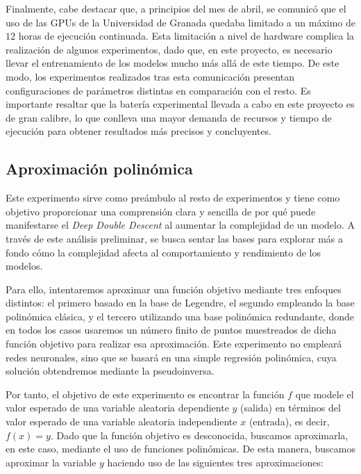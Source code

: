 Finalmente, cabe destacar que, a principios del mes de abril, se comunicó que el uso de las GPUs de la Universidad de Granada quedaba limitado a un máximo de $12$ horas de ejecución continuada. Esta limitación a nivel de hardware complica la realización de algunos experimentos, dado que, en este proyecto, es necesario llevar el entrenamiento de los modelos mucho más allá de este tiempo. De este modo, los experimentos realizados tras esta comunicación presentan configuraciones de parámetros distintas en comparación con el resto. Es importante resaltar que la batería experimental llevada a cabo en este proyecto es de gran calibre, lo que conlleva una mayor demanda de recursos y tiempo de ejecución para obtener resultados más precisos y concluyentes.

\subsection{Aproximación polinómica}\label{subsec:approx-polinomica}

Este experimento sirve como preámbulo al resto de experimentos y tiene como objetivo proporcionar una comprensión clara y sencilla de por qué puede manifestarse el \textit{Deep Double Descent} al aumentar la complejidad de un modelo. A través de este análisis preliminar, se busca sentar las bases para explorar más a fondo cómo la complejidad afecta al comportamiento y rendimiento de los modelos.

Para ello, intentaremos aproximar una función objetivo mediante tres enfoques distintos: el primero basado en la base de Legendre, el segundo empleando la base polinómica clásica, y el tercero utilizando una base polinómica redundante, donde en todos los casos usaremos un número finito de puntos muestreados de dicha función objetivo para realizar esa aproximación. Este experimento no empleará redes neuronales, sino que se basará en una simple regresión polinómica, cuya solución obtendremos mediante la pseudoinversa.

Por tanto, el objetivo de este experimento es encontrar la función $f$ que modele el valor esperado de una variable aleatoria dependiente $y$ (salida) en términos del valor esperado de una variable aleatoria independiente $x$ (entrada), es decir, $f(x)=y$. Dado que la función objetivo es desconocida, buscamos aproximarla, en este caso, mediante el uso de funciones polinómicas. De esta manera, buscamos aproximar la variable $y$ haciendo uso de las siguientes tres aproximaciones:

